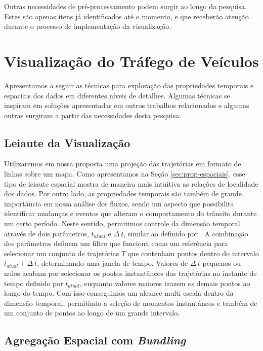  Outras necessidades de pré-processamento podem surgir ao longo da pesquisa.
Estes são apenas itens já identificados até o momento, e que receberão atenção
durante o processo de implementação da visualização.

\section{Visualização do Tráfego de Veículos}

  Apresentamos a seguir as técnicas para exploração das propriedades temporais
e espaciais dos dados em diferentes níveis de detalhes. Algumas técnicas se
inspiram em soluções apresentadas em outros trabalhos relacionados e algumas
outras surgiram a partir das necessidades desta pesquisa.

\subsection{Leiaute da Visualização}
  
  Utilizaremos em nossa proposta uma projeção das trajetórias em formato de
linhas sobre um mapa.  Como apresentamos na Seção \ref{sec:prop-espaciais},
esse tipo de leiaute espacial mostra de maneira mais intuitiva as relações de
localidade dos dados. Por outro lado, as propriedades temporais são também de
grande importância em nossa análise dos fluxos, sendo um aspecto que
possibilita identificar mudanças e eventos que alteram o comportamento do
trânsito durante um certo período.  Neste sentido, permitimos controle da
dimensão temporal através de dois parâmetros, $t_{atual}$ e $\Delta~t$, similar
ao definido por \citet{Klein2014}.  A combinação dos parâmetros definem um
filtro que funciona como um referência para selecionar um conjunto de
trajetórias  ${T}$ que contenham pontos dentro do intervalo $t_{atual} +
\Delta~t$, determinando uma janela de tempo. Valores de $\Delta~t$ pequenos ou
nulos acabam por selecionar os pontos instantâneos das trajetórias no instante
de tempo definido por $t_{atual}$, enquanto valores maiores trazem os demais
pontos ao longo do tempo. Com isso conseguimos um alcance multi escala dentro
da dimensão temporal, permitindo a seleção de momentos instantâneos e também de
um conjunto de pontos ao longo de um grande intervalo.

\subsection{Agregação Espacial com \emph{Bundling}}

